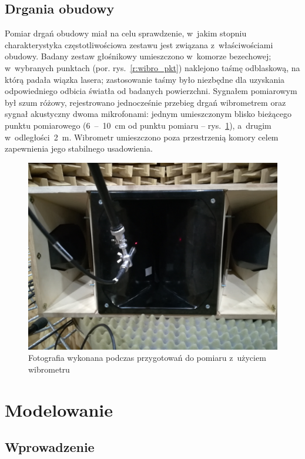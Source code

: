 \documentclass[12pt]{oska}
\newcommand{\range}[2]{\num{#1}~--~\num{#2}}
\begin{document}
	\subsection{Drgania obudowy}
	
	Pomiar drgań obudowy miał na celu sprawdzenie, w~jakim stopniu charakterystyka częstotliwościowa zestawu jest związana z~właściwościami obudowy. Badany zestaw głośnikowy umieszczono w~komorze bezechowej; w~wybranych punktach (por. rys.~\ref{r:wibro_pkt}) naklejono taśmę odblaskową, na którą padała wiązka lasera; zastosowanie taśmy było niezbędne dla uzyskania odpowiedniego odbicia światła od badanych powierzchni. %
	Sygnałem pomiarowym był szum różowy, rejestrowano jednocześnie przebieg drgań wibrometrem oraz sygnał akustyczny dwoma mikrofonami: jednym umieszczonym blisko bieżącego punktu pomiarowego (\range{6}{10}~\si{\cm} od punktu pomiaru -- rys.~\ref{r:wibro_zdjecie}), a~drugim w~odległości~\SI{2}{\metre}. Wibrometr umieszczono poza przestrzenią komory celem zapewnienia jego stabilnego usadowienia.
	
	\begin{figure}[!ht]
		\centering
		\includegraphics[width=.7\textwidth]{zdjecie_wibro.jpg}
		\caption{Fotografia wykonana podczas przygotowań do pomiaru z~użyciem wibrometru}
		\label{r:wibro_zdjecie}
	\end{figure}
	
	
	\section{Modelowanie}
	
	\subsection{Wprowadzenie}
	
\end{document}
